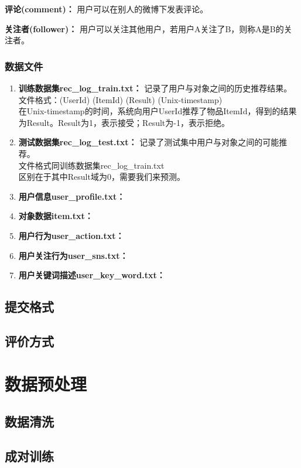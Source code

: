 \documentclass[12pt]{article} %
\begin{document}
\begin{sloppypar}
{\bf 评论(comment)：} 用户可以在别人的微博下发表评论。

{\bf 关注者(follower)：} 用户可以关注其他用户，若用户A关注了B，则称A是B的关注者。

\subsubsection{数据文件}

\begin{enumerate}
	\item {\bf 训练数据集rec\_log\_train.txt：} 记录了用户与对象之间的历史推荐结果。\\
	文件格式：(UserId) (ItemId) (Result) (Unix-timestamp)\\
	在Unix-timestamp的时间，系统向用户UserId推荐了物品ItemId，得到的结果为Result。Result为1，表示接受；Result为-1，表示拒绝。
	\item {\bf 测试数据集rec\_log\_test.txt：} 记录了测试集中用户与对象之间的可能推荐。\\
	文件格式同训练数据集rec\_log\_train.txt\\
	区别在于其中Result域为0，需要我们来预测。
	\item {\bf 用户信息user\_profile.txt：}
	\item {\bf 对象数据item.txt：}
	\item {\bf 用户行为user\_action.txt：}
	\item {\bf 用户关注行为user\_sns.txt：}
	\item {\bf 用户关键词描述user\_key\_word.txt：}
\end{enumerate}

\subsection{提交格式}

\subsection{评价方式}


\newpage
\section{数据预处理}

\subsection{数据清洗}

\subsection{成对训练}


\end{sloppypar}
\end{document}
